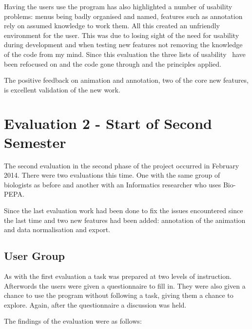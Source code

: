 Having the users use the program has also highlighted a number of usability problems: menus being badly organised and named, features such as annotation rely on assumed knowledge to work them.  All this created an unfriendly environment for the user.  This was due to losing sight of the need for usability during development and when testing new features not removing the knowledge of the code from my mind.  Since this evaluation the three lists of usability~\cite{shgold}\cite{normeval}\cite{neilten} have been refocused on and the code gone through and the principles applied.

The positive feedback on animation and annotation, two of the core new features, is excellent validation of the new work.

\section{Evaluation 2 - Start of Second Semester}

The second evaluation in the second phase of the project occurred in February 2014.  There were two evaluations this time.  One with the same group of biologists as before and another with an Informatics researcher who uses Bio-PEPA.

Since the last evaluation work had been done to fix the issues encountered since the last time and two new features had been added: annotation of the animation and data normalisation and export.

\subsection{User Group}

As with the first evaluation a task was prepared at two levels of instruction.  Afterwords the users were given a questionnaire to fill in.  They were also given a chance to use the program without following a task, giving them a chance to explore.  Again, after the questionnaire a discussion was held.

The findings of the evaluation were as follows:

